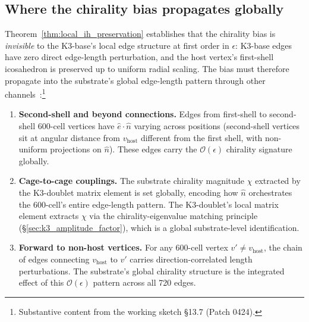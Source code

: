 \documentclass[11pt,letterpaper]{article}
\begin{document}
\subsection{Where the chirality bias propagates globally}\label{sec:chirality_propagation}

Theorem~\ref{thm:local_ih_preservation} establishes that the chirality bias is \emph{invisible} to the K3-base's local edge structure at first order in $\epsilon$: K3-base edges have zero direct edge-length perturbation, and the host vertex's first-shell icosahedron is preserved up to uniform radial scaling. The bias must therefore propagate into the substrate's global edge-length pattern through other channels~\cite{abshier_capotauro_chiral_mechanism_sketch}:\footnote{Substantive content from the working sketch \S13.7 (Patch 0424).}

\begin{enumerate}\setlength\itemsep{0.2em}
    \item \textbf{Second-shell and beyond connections.} Edges from first-shell to second-shell 600-cell vertices have $\hat{e} \cdot \hat{n}$ varying across positions (second-shell vertices sit at angular distance from $v_{\text{host}}$ different from the first shell, with non-uniform projections on $\hat{n}$). These edges carry the $\mathcal{O}(\epsilon)$ chirality signature globally.
    \item \textbf{Cage-to-cage couplings.} The substrate chirality magnitude $\chi$ extracted by the K3-doublet matrix element is set globally, encoding how $\hat{n}$ orchestrates the 600-cell's entire edge-length pattern. The K3-doublet's local matrix element extracts $\chi$ via the chirality-eigenvalue matching principle (\S\ref{sec:k3_amplitude_factor}), which is a global substrate-level identification.
    \item \textbf{Forward to non-host vertices.} For any 600-cell vertex $v' \neq v_{\text{host}}$, the chain of edges connecting $v_{\text{host}}$ to $v'$ carries direction-correlated length perturbations. The substrate's global chirality structure is the integrated effect of this $\mathcal{O}(\epsilon)$ pattern across all 720 edges.
\end{enumerate}
\end{document}
